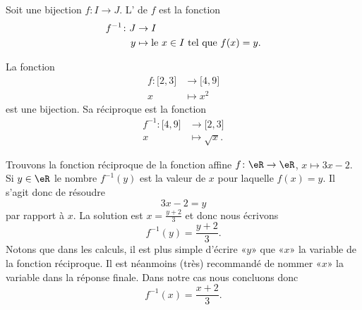 \begin{definition}
    Soit une bijection \( f\colon I\to J\). L' de \( f\) est la fonction
    \begin{equation}
        \begin{aligned}
            f^{-1}\colon J&\to I \\
            y&\mapsto \text{le \( x\in I\) tel que \( f(x)=y\)}. 
        \end{aligned}
    \end{equation}
\end{definition}

\begin{example}
    La fonction
    \begin{equation}
        \begin{aligned}
            f\colon \mathopen[ 2 , 3 \mathclose]&\to \mathopen[ 4 , 9 \mathclose] \\
            x&\mapsto x^2 
        \end{aligned}
    \end{equation}
    est une bijection. Sa réciproque est la fonction
    \begin{equation}
        \begin{aligned}
            f^{-1}\colon \mathopen[ 4 , 9 \mathclose]&\to \mathopen[ 2 , 3 \mathclose] \\
            x&\mapsto \sqrt{x}. 
        \end{aligned}
    \end{equation}
\end{example}

\begin{example}
    Trouvons la fonction réciproque de la fonction affine \( f\colon \eR\to \eR\), \( x\mapsto 3x-2\). Si \( y\in \eR\) le nombre \( f^{-1}(y)\) est la valeur de \( x\) pour laquelle \( f(x)=y\). Il s'agit donc de résoudre
    \begin{equation}
        3x-2=y
    \end{equation}
    par rapport à \( x\). La solution est \( x=\frac{ y+2 }{ 3 }\) et donc nous écrivons
    \begin{equation}
        f^{-1}(y)=\frac{ y+2 }{ 3 }.
    \end{equation}
    Notons que dans les calculs, il est plus simple d'écrire «\( y\)» que «\( x\)» la variable de la fonction réciproque. Il est néanmoins (très) recommandé de nommer «\( x\)» la variable dans la réponse finale. Dans notre cas nous concluons donc
    \begin{equation}
        f^{-1}(x)=\frac{ x+2 }{ 3 }.
    \end{equation}
\end{example}

